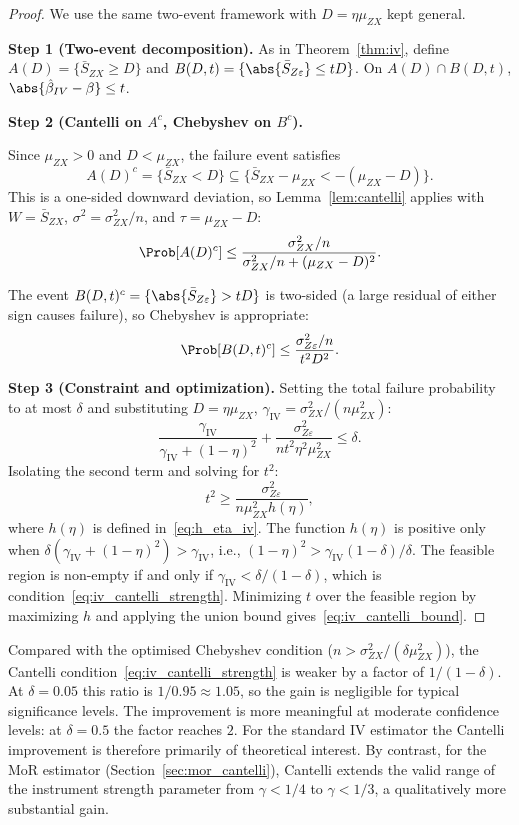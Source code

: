 \begin{proof}
    We use the same two-event framework with $D = \eta\mu_{ZX}$ kept general.

    \medskip\noindent\textbf{Step 1 (Two-event decomposition).}
    As in Theorem~\ref{thm:iv}, define $A(D) = \{\bar{S}_{ZX}\geq D\}$ and $B(D,t) = \{\abs{\bar{S}_{Z\varepsilon}}\leq tD\}$.
    On $A(D)\cap B(D,t)$, $\abs{\hat\beta_{IV}-\beta}\leq t$.

    \medskip\noindent\textbf{Step 2 (Cantelli on $A^c$, Chebyshev on $B^c$).}

    Since $\mu_{ZX}>0$ and $D<\mu_{ZX}$, the failure event satisfies
    \[
        A(D)^c = \{\bar{S}_{ZX} < D\}
        \subseteq
        \{\bar{S}_{ZX} - \mu_{ZX} < -(\mu_{ZX}-D)\}.
    \]
    This is a one-sided downward deviation, so Lemma~\ref{lem:cantelli} applies with $W=\bar{S}_{ZX}$, $\sigma^2=\sigma_{ZX}^2/n$, and $\tau=\mu_{ZX}-D$:
    \[
        \Prob[A(D)^c]
        \leq
        \frac{\sigma_{ZX}^2/n}{\sigma_{ZX}^2/n + (\mu_{ZX}-D)^2}.
    \]

    The event $B(D,t)^c = \{\abs{\bar{S}_{Z\varepsilon}}>tD\}$ is two-sided (a large residual of either sign causes failure), so Chebyshev is appropriate:
    \[
        \Prob[B(D,t)^c] \leq \frac{\sigma_{Z\varepsilon}^2/n}{t^2 D^2}.
    \]

    \medskip\noindent\textbf{Step 3 (Constraint and optimization).}
    Setting the total failure probability to at most $\delta$ and substituting $D=\eta\mu_{ZX}$, $\gamma_{\mathrm{IV}}=\sigma_{ZX}^2/(n\mu_{ZX}^2)$:
    \[
        \frac{\gamma_{\mathrm{IV}}}{\gamma_{\mathrm{IV}}+(1-\eta)^2}
        + \frac{\sigma_{Z\varepsilon}^2}{n t^2\eta^2\mu_{ZX}^2}
        \leq \delta.
    \]
    Isolating the second term and solving for $t^2$:
    \[
        t^2 \geq \frac{\sigma_{Z\varepsilon}^2}{n\mu_{ZX}^2h(\eta)},
    \]
    where $h(\eta)$ is defined in~\eqref{eq:h_eta_iv}. The function $h(\eta)$ is positive only when $\delta(\gamma_{\mathrm{IV}}+(1-\eta)^2)>\gamma_{\mathrm{IV}}$, i.e., $(1-\eta)^2>\gamma_{\mathrm{IV}}(1-\delta)/\delta$. The feasible region is non-empty if and only if $\gamma_{\mathrm{IV}}<\delta/(1-\delta)$, which is condition~\eqref{eq:iv_cantelli_strength}. Minimizing $t$ over the feasible region by maximizing $h$ and applying the union bound gives~\eqref{eq:iv_cantelli_bound}.
\end{proof}

\begin{remark}
\label{rem:cantelli_gain}
    Compared with the optimised Chebyshev condition ($n>\sigma_{ZX}^2/(\delta\mu_{ZX}^2)$), the Cantelli condition~\eqref{eq:iv_cantelli_strength} is weaker by a factor of $1/(1-\delta)$. At $\delta=0.05$ this ratio is $1/0.95\approx 1.05$, so the gain is negligible for typical significance levels. The improvement is more meaningful at moderate confidence levels: at $\delta=0.5$ the factor reaches $2$. For the standard IV estimator the Cantelli improvement is therefore primarily of theoretical interest. By contrast, for the MoR estimator (Section~\ref{sec:mor_cantelli}), Cantelli extends the valid range of the instrument strength parameter from $\gamma<1/4$ to $\gamma<1/3$, a qualitatively more substantial gain.
\end{remark}

